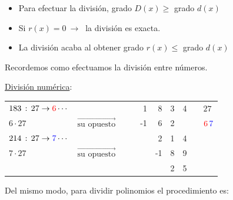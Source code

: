 \begin{itemize}
\item Para efectuar la división, grado $D(x) \geq $ grado $d(x)$	
\item Si $r(x)=0 \ \to \ $ la división es exacta.
\item La división acaba al obtener grado $r(x) \leq $ grado $d(x)$
\end{itemize}

\vspace{5mm}
Recordemos como efectuamos la división entre números.

\underline{División numérica}:
\begin{table}[H]
\centering
\small
\begin{tabular}{llrrrrl}
\textcolor{gris}{$183\, :\, 27 \to \textcolor{red}{6}\cdots $} &  & 1 & 8 & 3 & \multicolumn{1}{r|}{4} & $\quad 27$ \\ \cline{7-7} 
\textcolor{gris}{$6\cdot 27$} & \scriptsize{\textcolor{gris}{$\overrightarrow{\text{su opuesto}} \qquad$}} & \textcolor{gris}{-1} & \textcolor{gris}{6} & \textcolor{gris}{2} &  & $\quad \textcolor{red}{6}\, \textcolor{blue}{7}$ \\ \cline{3-5}
\textcolor{gris}{$214\, : \, 27 \to \textcolor{blue}{7}\cdots$} &  &  & 2 & 1 & 4 &  \\
\textcolor{gris}{$7\cdot 27$} & \scriptsize{\textcolor{gris}{$\overrightarrow{\text{su opuesto}} \qquad$}} &  & \textcolor{gris}{-1} & \textcolor{gris}{8} & \textcolor{gris}{9} &  \\ \cline{5-6}
 &  &  &  & 2 & 5 & 
\end{tabular}
\end{table}

Del mismo modo, para dividir polinomios el procedimiento es:

